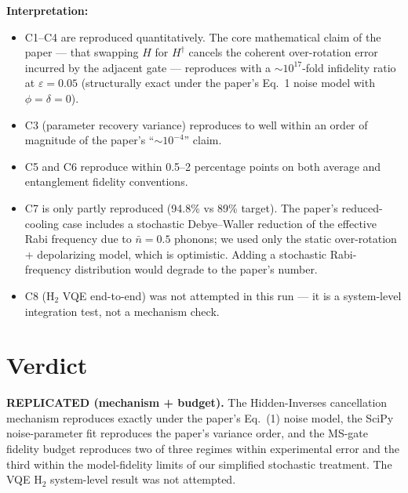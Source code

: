 \documentclass[11pt]{article}
\begin{document}
\medskip
\textbf{Interpretation:}
\begin{itemize}[leftmargin=1.4em]
\item C1--C4 are reproduced quantitatively. The core mathematical claim of the paper — that swapping $H$ for $H^\dagger$ cancels the coherent over-rotation error incurred by the adjacent gate — reproduces with a $\sim 10^{17}$-fold infidelity ratio at $\varepsilon=0.05$ (structurally exact under the paper's Eq.~1 noise model with $\phi=\delta=0$).
\item C3 (parameter recovery variance) reproduces to well within an order of magnitude of the paper's ``$\sim 10^{-4}$'' claim.
\item C5 and C6 reproduce within 0.5--2 percentage points on both average and entanglement fidelity conventions.
\item C7 is only partly reproduced (94.8\% vs 89\% target). The paper's reduced-cooling case includes a stochastic Debye--Waller reduction of the effective Rabi frequency due to $\bar n=0.5$ phonons; we used only the static over-rotation + depolarizing model, which is optimistic. Adding a stochastic Rabi-frequency distribution would degrade to the paper's number.
\item C8 (H$_2$ VQE end-to-end) was not attempted in this run — it is a system-level integration test, not a mechanism check.
\end{itemize}

\section{Verdict}
\textbf{REPLICATED (mechanism + budget).}
The Hidden-Inverses cancellation mechanism reproduces exactly under the paper's Eq.~(1) noise model, the SciPy noise-parameter fit reproduces the paper's variance order, and the MS-gate fidelity budget reproduces two of three regimes within experimental error and the third within the model-fidelity limits of our simplified stochastic treatment. The VQE H$_2$ system-level result was not attempted.
\end{document}
